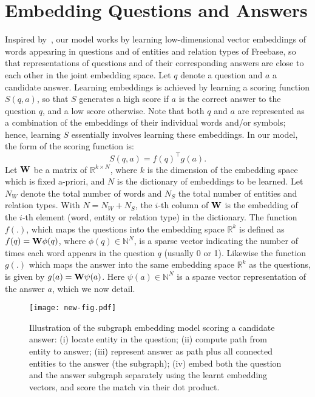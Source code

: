\documentclass[runningheads,a4paper]{llncs}
\newcommand{\fb}{{\sc Freebase}\xspace}
\begin{document}
\section{Embedding Questions and Answers} \label{model} 


Inspired
by~\cite{bordes2014open}, our model works by learning low-dimensional
vector embeddings of words appearing in questions and of
entities and relation types of \fb, so that representations of 
questions and of their corresponding answers are close to each other
in the joint embedding space. 
Let $q$ denote a question and $a$ a candidate answer.  
Learning embeddings is achieved by learning a scoring function $S(q, a)$,  
so that $S$ generates a high score if $a$ is the correct 
answer to the question $q$, and a low score otherwise. Note that both $q$ and $a$ 
are represented as a combination of the embeddings of their individual words and/or 
symbols; hence, learning $S$ essentially involves learning these 
embeddings. In our model, the form of the scoring function is: 
\begin{equation} \label{rank-eq}
S(q, a) = f(q)^{\top}g(a). 
\end{equation}
Let $\bf{W}$ be a matrix of $\mathbb{R}^{k \times N}$, 
where $k$ is the dimension of the embedding space which is fixed a-priori,
and $N$ is the dictionary of embeddings to be learned.
Let $N_{W}$ denote the total number of words
and $N_{S}$ the total number of entities and relation types.
With $N = N_{W} + N_{S}$, the
 $i$-th column of ${\bf W}$ is the embedding of the $i$-th 
element (word, entity or relation type) in the dictionary. 
The function $f(.)$, which maps the questions into the embedding 
space $\mathbb{R}^k$ is defined as $f(q) = {\bf W}\phi(q)$, where 
$\phi(q) \in \mathbb{N}^N$, is a sparse vector indicating the 
number of times each word appears in the question $q$ (usually 0 or 1). 
Likewise the function $g(.)$ which maps the answer 
into the same embedding space $\mathbb{R}^k$ as the questions, 
is given by $g(a) = {\bf W}\psi(a)$. 
Here $\psi(a) \in \mathbb{N}^N$ is a sparse vector representation 
of the answer $a$, which we now detail. 

\begin{figure*}
\begin{center}
\texttt{[image: new-fig.pdf]}
\caption{\label{fig:subgraph} Illustration of the subgraph embedding
  model scoring a candidate answer: (i) locate entity in the question;
  (ii) compute path from entity to answer; (iii) represent answer as
  path plus all connected entities to the answer (the subgraph); (iv)
  embed both the question and the answer subgraph separately using the
  learnt embedding vectors, and score the match via their dot
  product.}
\end{center}
\end{figure*}
\end{document}
